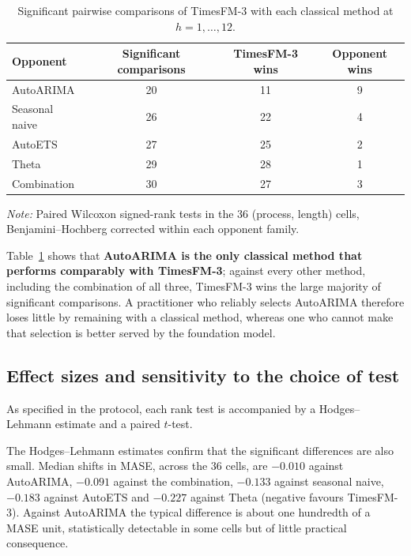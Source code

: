 \documentclass[article]{ajs}
\providecommand{\tableref}[1]{Table~\ref{#1}}
\begin{document}
\begin{table}[!htbp]
\centering
\begin{threeparttable}
\caption{Significant pairwise comparisons of TimesFM-3 with each classical method at
$h = 1,\dots,12$.}
\label{tab:opponents}
\begin{tabular}{lccc}
\toprule
Opponent & Significant comparisons & TimesFM-3 wins & Opponent wins \\
\midrule
AutoARIMA          & 20 & 11 & 9 \\
Seasonal naive     & 26 & 22 & 4 \\
AutoETS            & 27 & 25 & 2 \\
Theta              & 29 & 28 & 1 \\
Combination        & 30 & 27 & 3 \\
\bottomrule
\end{tabular}
\begin{tablenotes}[flushleft]\footnotesize
\item \textit{Note:} Paired Wilcoxon signed-rank tests in the 36 (process, length) cells,
Benjamini--Hochberg corrected within each opponent family.
\end{tablenotes}
\end{threeparttable}
\end{table}

\tableref{tab:opponents} shows that \textbf{AutoARIMA is the only classical method that performs
comparably with TimesFM-3}; against every other method, including the combination of all three,
TimesFM-3 wins the large majority of significant comparisons. A practitioner who reliably selects
AutoARIMA therefore loses little by remaining with a classical method, whereas one who cannot make
that selection is better served by the foundation model.

\subsection{Effect sizes and sensitivity to the choice of test}
\label{sec:effects}

As specified in the protocol, each rank test is accompanied by a Hodges--Lehmann estimate and a
paired $t$-test.

The Hodges--Lehmann estimates confirm that the significant differences are also small. Median
shifts in MASE, across the 36 cells, are $-0.010$ against AutoARIMA, $-0.091$ against the
combination, $-0.133$ against seasonal naive, $-0.183$ against AutoETS and $-0.227$ against Theta
(negative favours TimesFM-3). Against AutoARIMA the typical difference is about one hundredth of
a MASE unit, statistically detectable in some cells but of little practical consequence.
\end{document}
